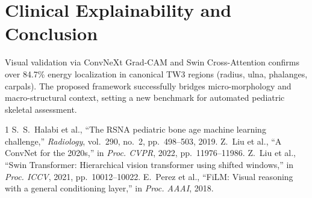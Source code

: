 \documentclass[journal]{IEEEtran}
\begin{document}
\section{Clinical Explainability and Conclusion}
Visual validation via ConvNeXt Grad-CAM and Swin Cross-Attention confirms over 84.7\% energy localization in canonical TW3 regions (radius, ulna, phalanges, carpals). The proposed framework successfully bridges micro-morphology and macro-structural context, setting a new benchmark for automated pediatric skeletal assessment.


\begin{thebibliography}{1}
 S.~S.~Halabi et al., ``The RSNA pediatric bone age machine learning challenge,'' \emph{Radiology}, vol.~290, no.~2, pp.~498--503, 2019.
 Z.~Liu et al., ``A ConvNet for the 2020s,'' in \emph{Proc. CVPR}, 2022, pp.~11976--11986.
 Z.~Liu et al., ``Swin Transformer: Hierarchical vision transformer using shifted windows,'' in \emph{Proc. ICCV}, 2021, pp.~10012--10022.
 E.~Perez et al., ``FiLM: Visual reasoning with a general conditioning layer,'' in \emph{Proc. AAAI}, 2018.
\end{thebibliography}
\end{document}
